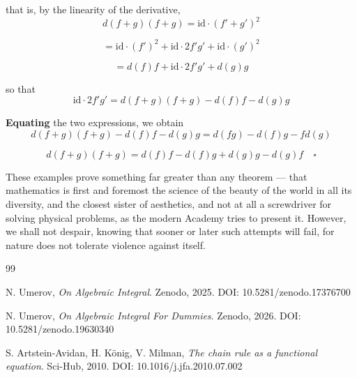\documentclass[12pt]{article}
\theoremstyle{definition}
\begin{document}
that is, by the linearity of the derivative,
\[
d(f+g)(f+g) = \mathrm{id} \cdot (f' + g')^2
\]

\[
= \mathrm{id} \cdot (f')^2 + \mathrm{id} \cdot 2f'g' + \mathrm{id} \cdot (g')^2
\]

\[
= d(f)f + \mathrm{id} \cdot 2f'g' + d(g)g
\]

so that
\[
\mathrm{id} \cdot 2f'g' = d(f+g)(f+g) - d(f)f - d(g)g
\]

\vspace{10pt}
\textbf{Equating} the two expressions, we obtain
\[
d(f+g)(f+g) - d(f)f - d(g)g = d(fg) - d(f)g - f d(g)
\]

\[
d(f+g)(f+g) = d(f)f - d(f)g + d(g)g - d(g)f \quad \square
\]

\vspace{30pt}
\noindent These examples prove something far greater than any theorem --- that mathematics is first 
and foremost the science of the beauty of the world in all its diversity, and the closest sister of aesthetics, 
and not at all a screwdriver for solving physical problems, as the modern Academy tries to present it.
However, we shall not despair, knowing that sooner or later such attempts will fail, 
for nature does not tolerate violence against itself.

\newpage
\begin{thebibliography}{99}

N. Umerov,
\textit{On Algebraic Integral}.
Zenodo, 2025.
DOI: 10.5281/zenodo.17376700

N. Umerov,
\textit{On Algebraic Integral For Dummies}.
Zenodo, 2026.
DOI: 10.5281/zenodo.19630340

S. Artstein-Avidan, H. König, V. Milman, 
\textit{The chain rule as a functional equation}.
Sci-Hub, 2010.
DOI: 10.1016/j.jfa.2010.07.002

\end{thebibliography}
\end{document}
